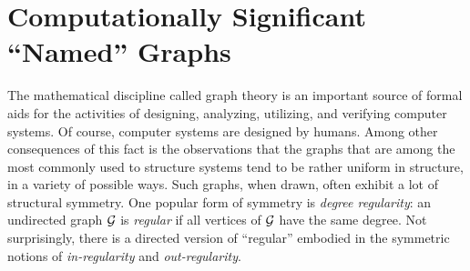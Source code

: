


\section{Computationally Significant ``Named'' Graphs}
\label{sec:graphs-important-families}

The mathematical discipline called graph theory is an important source
of formal aids for the activities of designing, analyzing, utilizing,
and verifying computer systems.  Of course, computer systems are
designed by humans.  Among other consequences of this fact is the
observations that the graphs that are among the most commonly used to
structure systems tend to be rather uniform in structure, in a variety
of possible ways.  Such graphs, when drawn, often exhibit a lot of
structural symmetry.  One popular form of symmetry is {\it degree
  regularity}: an undirected graph $\mbox{$\cal G$}$ is {\it regular}
 if all vertices of $\mbox{$\cal G$}$ have the same degree.  Not
surprisingly, there is a directed version of ``regular'' embodied in the
symmetric notions of {\it in-regularity}
 and {\it out-regularity}.

\medskip

